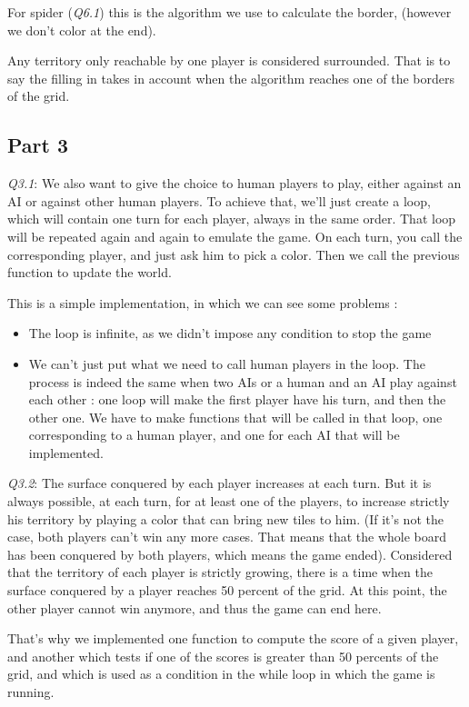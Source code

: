 \documentclass[a4paper]{article}
\begin{document}
For spider (\textit{Q6.1}) this is the algorithm we use to calculate the border, (however we don't color at the end).

 Any territory only reachable by one player is considered surrounded. That
is to say the filling in takes in account when the algorithm reaches one
of the borders of the grid.\newline


\subsection{Part 3}

\emph{Q3.1}: We also want to give the choice to human players to play, either against an AI or against other human players. To achieve that, we'll just create a loop, which will contain one turn for each player, always in the same order. That loop will be repeated again and again to emulate the game. On each turn, you call the corresponding player, and just ask him to pick a color. Then we call the previous function to update the world.

This is a simple implementation, in which we can see some problems :
\begin{itemize}
\item The loop is infinite, as we didn't impose any condition to stop the game
\item We can't just put what we need to call human players in the loop. The process is indeed the same when two AIs or a human and an AI play against each other : one loop will make the first player have his turn, and then the other one. We have to make functions that will be called in that loop, one corresponding to a human player, and one for each AI that will be implemented.
\end{itemize}

\emph{Q3.2}: The surface conquered by each player increases at each turn. But it is always possible, at each turn, for at least one of the
  players, to increase strictly his territory by playing a color that can bring new tiles to him.
   (If it's not the case, both players can't win any more cases. That means that the whole board has been conquered by both players,
    which means the game ended). Considered that the territory of each player is strictly growing, there is a time when the surface
     conquered by a player reaches 50 percent of the grid. At this point, the other player cannot win anymore, and thus the game
      can end here.

That's why we implemented one function to compute the score of a given player, and another which tests if one of the scores is greater than 50 percents of the grid, and which is used as a condition in the while loop in which the game is running.\newline
 
\end{document}
